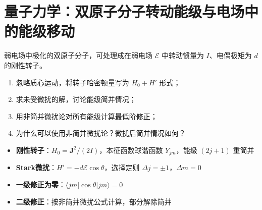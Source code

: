 \section{量子力学：双原子分子转动能级与电场中的能级移动}
\label{sec:rotor-stark-effect}

\begin{modelbox}[题目：双原子分子转动能级与电场中的能级移动]
弱电场中极化的双原子分子，可处理成在弱电场 $\mathcal{E}$ 中转动惯量为 $I$、电偶极矩为 $d$ 的刚性转子。
\begin{enumerate}
    \item 忽略质心运动，将转子哈密顿量写为 $H_0+H'$ 形式；
    \item 求未受微扰的解，讨论能级简并情况；
    \item 用非简并微扰论对所有能级计算最低阶修正；
    \item 为什么可以使用非简并微扰论？微扰后简并情况如何？
\end{enumerate}
\end{modelbox}

\begin{tipbox}[考点快速分析]
\begin{itemize}
    \item \textbf{刚性转子}：$H_0=\mathbf{J}^2/(2I)$，本征函数球谐函数 $Y_{jm}$，能级 $(2j+1)$ 重简并
    \item \textbf{Stark微扰}：$H'=-d\mathcal{E}\cos\theta$，选择定则 $\Delta j=\pm1$，$\Delta m=0$
    \item \textbf{一级修正为零}：$\langle jm|\cos\theta|jm\rangle=0$
    \item \textbf{二级修正}：按非简并微扰公式计算，部分解除简并
\end{itemize}
\end{tipbox}

